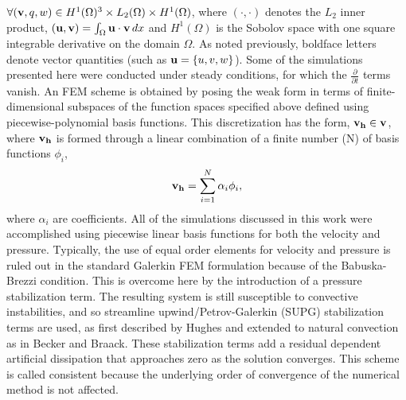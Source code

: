 $\forall ({\bf v},q,w) \in H^1(\Omega)^3 \times L_2(\Omega) \times
H^1(\Omega)$, where $(\cdot,\cdot)$ denotes the $L_2$ inner product, 
$({\bf u},{\bf v}) = \int_\Omega {\bf u} \cdot {\bf v} \, dx$ and
$H^1(\Omega)$ is the Sobolov space with one square integrable derivative
on the domain 
$\Omega$\cite{oden2012introduction}. As noted previously, boldface letters
denote vector quantities (such as ${\bf u} = \left \{ u,v,w \right \}$). 
Some of the simulations presented here were conducted under
steady conditions, for which the $\frac{\partial}{\partial t}$ terms
vanish. An FEM scheme is obtained by posing the weak form in
terms of finite-dimensional subspaces of the function spaces specified above
defined using piecewise-polynomial basis functions. This discretization
has the form, $ {\bf v_h} \in {\bf v}$, where ${\bf v_h}$ is 
formed through a linear combination of a finite number (N) of basis
functions $\phi_i$,  
\begin{equation}
 {\bf v_h} = \sum_{i=1}^N \alpha_i \phi_i,
\end{equation}
where $\alpha_i$ are coefficients\cite{becker1981introduction}.
%
%
All of the simulations discussed in this work were 
accomplished using piecewise linear basis functions for both the
velocity and pressure. Typically, the use of equal order elements for
velocity and pressure is ruled out in the standard Galerkin FEM
formulation because of the Babuska-Brezzi condition\cite{bb-cond}. 
This is overcome here by 
the introduction of a pressure stabilization
term\cite{becker1981introduction}. The resulting system is still
susceptible to convective instabilities, and so streamline upwind/Petrov-Galerkin
(SUPG) stabilization terms are used, as first described by
Hughes\cite{Hughes198685,supg} and extended to natural convection as in
Becker and Braack\cite{Becker2002428}. These stabilization terms add a
residual dependent artificial dissipation that approaches zero as the
solution converges. This scheme is called consistent because the
underlying order of convergence of the numerical method is not
affected\cite{hughes2000finite}.    

